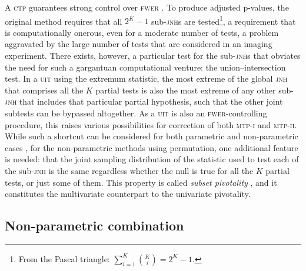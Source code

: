 A \textsc{ctp} guarantees strong control over \textsc{fwer} \citep{Marcus1976}. To produce adjusted p-values, the original method requires that all $2^K-1$ sub-\textsc{jnh}s are tested\footnote{From the Pascal triangle: $\sum_{i=1}^K \binom{K}{i} = 2^K-1$.}, a requirement that is computationally onerous, even for a moderate number of tests, a problem aggravated by the large number of tests that are considered in an imaging experiment. There exists, however, a particular test for the sub-\textsc{jnh}s that obviates the need for such a gargantuan computational venture: the union--intersection test. In a \textsc{uit} using the extremum statistic, the most extreme of the global \textsc{jnh} that comprises all the $K$ partial tests is also the most extreme of any other sub-\textsc{jnh} that includes that particular partial hypothesis, such that the other joint subtests can be bypassed altogether. As a \textsc{uit} is also an \textsc{fwer}-controlling procedure, this raises various possibilities for correction of both \textsc{mtp-i} and \textsc{mtp-ii}. While such a shortcut can be considered for both parametric \citep{Holm1979} and non-parametric cases \citep{Westfall1993}, for the non-parametric methods using permutation, one additional feature is needed: that the joint sampling distribution of the statistic used to test each of the sub-\textsc{jnh} is the same regardless whether the null is true for all the $K$ partial tests, or just some of them. This property is called \emph{subset pivotality} \citep{Westfall1993, Westfall2008}, and it constitutes the multivariate counterpart to the univariate pivotality.

\subsection{Non-parametric combination}
\label{sec:comb:npc}

